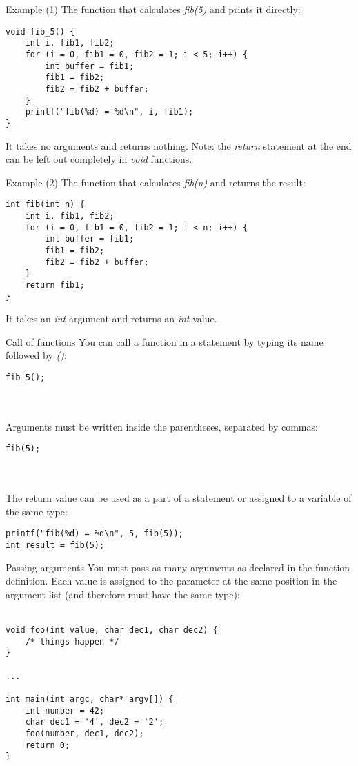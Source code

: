 \begin{frame}[fragile]{Example (1)}
	The function that calculates \textit{fib(5)} and prints it directly:
	\begin{lstlisting}
void fib_5() {
	int i, fib1, fib2;
	for (i = 0, fib1 = 0, fib2 = 1; i < 5; i++) {
		int buffer = fib1;
		fib1 = fib2;
		fib2 = fib2 + buffer;
	}
	printf("fib(%d) = %d\n", i, fib1);
}
\end{lstlisting}
	It takes no arguments and returns nothing.
	Note: the \textit{return} statement at the end can be left out completely in \textit{void} functions.
\end{frame}
\begin{frame}[fragile]{Example (2)}
	The function that calculates \textit{fib(n)} and returns the result:
	\begin{lstlisting}
int fib(int n) {
	int i, fib1, fib2;
	for (i = 0, fib1 = 0, fib2 = 1; i < n; i++) {
		int buffer = fib1;
		fib1 = fib2;
		fib2 = fib2 + buffer;
	}
	return fib1;
}
\end{lstlisting}
		It takes an \textit{int} argument and returns an \textit{int} value.
\end{frame}
\begin{frame}[fragile]{Call of functions}
	You can call a function in a statement by typing its name followed by \textit{()}:
	\begin{lstlisting}[numbers=none]
fib_5();
\end{lstlisting} \ \\ \ \\
	Arguments must be written inside the parentheses, separated by commas:
	\begin{lstlisting}[numbers=none]
fib(5);
\end{lstlisting} \ \\ \ \\
	The return value can be used as a part of a statement or assigned to a variable of the same type:
	\begin{lstlisting}[numbers=none]
printf("fib(%d) = %d\n", 5, fib(5));
int result = fib(5);
\end{lstlisting}
\end{frame}
\begin{frame}[fragile]{Passing arguments}
	You must pass as many arguments as declared in the function definition. Each value is assigned to the parameter at the same position in the argument list (and therefore must have the same type): \ \\ \ \\
	\begin{lstlisting}
void foo(int value, char dec1, char dec2) {
	/* things happen */
}

...

int main(int argc, char* argv[]) {
	int number = 42;
	char dec1 = '4', dec2 = '2';
	foo(number, dec1, dec2);
	return 0;
}
\end{lstlisting}
\end{frame}
